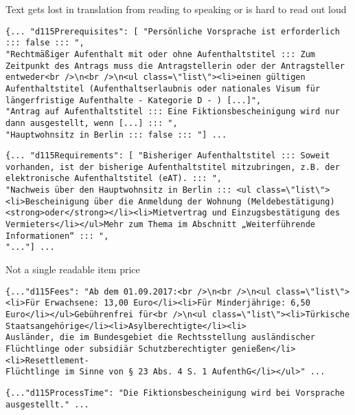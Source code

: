Text gets lost in translation from reading to speaking or is hard to read out loud
\begin{verbatim}
{... "d115Prerequisites": [ "Persönliche Vorsprache ist erforderlich ::: false ::: ",
"Rechtmäßiger Aufenthalt mit oder ohne Aufenthaltstitel ::: Zum Zeitpunkt des Antrags muss die Antragstellerin oder der Antragsteller entweder<br />\n<br />\n<ul class=\"list\"><li>einen gültigen Aufenthaltstitel (Aufenthaltserlaubnis oder nationales Visum für längerfristige Aufenthalte - Kategorie D - ) [...]",
"Antrag auf Aufenthaltstitel ::: Eine Fiktionsbescheinigung wird nur dann ausgestellt, wenn [...] ::: ",
"Hauptwohnsitz in Berlin ::: false ::: "] ...
\end{verbatim}

\begin{verbatim}
{... "d115Requirements": [ "Bisheriger Aufenthaltstitel ::: Soweit vorhanden, ist der bisherige Aufenthaltstitel mitzubringen, z.B. der elektronische Aufenthaltstitel (eAT). ::: ",
"Nachweis über den Hauptwohnsitz in Berlin ::: <ul class=\"list\"><li>Bescheinigung über die Anmeldung der Wohnung (Meldebestätigung) <strong>oder</strong></li><li>Mietvertrag und Einzugsbestätigung des Vermieters</li></ul>Mehr zum Thema im Abschnitt „Weiterführende Informationen“ ::: ",
"..."] ...
\end{verbatim}

Not a single readable item price
\begin{verbatim}
{..."d115Fees": "Ab dem 01.09.2017:<br />\n<br />\n<ul class=\"list\"><li>Für Erwachsene: 13,00 Euro</li><li>Für Minderjährige: 6,50 Euro</li></ul>Gebührenfrei für<br />\n<ul class=\"list\"><li>Türkische Staatsangehörige</li><li>Asylberechtigte</li><li>
Ausländer, die im Bundesgebiet die Rechtsstellung ausländischer Flüchtlinge oder subsidiär Schutzberechtigter genießen</li><li>Resettlement-
Flüchtlinge im Sinne von § 23 Abs. 4 S. 1 AufenthG</li></ul>" ...
\end{verbatim}

\begin{verbatim}
{..."d115ProcessTime": "Die Fiktionsbescheinigung wird bei Vorsprache ausgestellt." ...
\end{verbatim}

